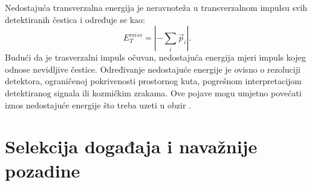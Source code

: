 \begin{otherlanguage}{croatian}
\par Nedostajuća transverzalna energija je neravnoteža u transverzalnom impulsu svih detektiranih čestica i određuje se kao:
\begin{equation}
E_T^{miss}= |-\sum_{i} \vec{p}_i|.
\end{equation}
Budući da je trasverzalni impuls očuvan, nedostajuća energija mjeri impuls kojeg odnose nevidljive čestice. Određivanje nedostajuće energije je ovisno o rezoluciji detektora, ograničenoj pokrivenosti prostornog kuta, pogrešnom interpretacijom detektiranog signala ili kozmičkim zrakama. Ove pojave mogu umjetno povećati iznos nedostajuće energije što treba uzeti u obzir \cite{Chatrchyan:2011tn}.  

\section{Selekcija događaja i navažnije pozadine}
 

\end{otherlanguage}
